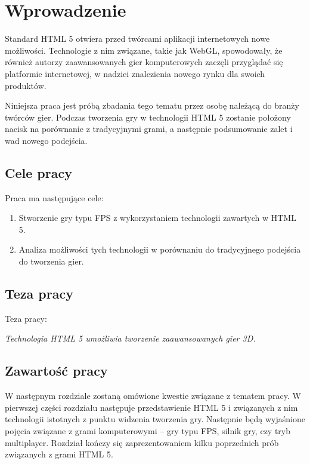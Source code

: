 \chapter{Wprowadzenie}
\label{cha:wprowadzenie}

Standard HTML 5 otwiera przed twórcami aplikacji internetowych nowe możliwości. Technologie z nim
związane, takie jak WebGL, spowodowały, że również autorzy zaawansowanych gier komputerowych
zaczęli przyglądać się platformie internetowej, w nadziei znalezienia nowego rynku dla swoich
produktów.

Niniejsza praca jest próbą zbadania tego tematu przez osobę należącą do branży twórców gier.
Podczas tworzenia gry w technologii HTML 5 zostanie położony nacisk na porównanie z tradycyjnymi
grami, a następnie podsumowanie zalet i wad nowego podejścia.


\section{Cele pracy}
\label{sec:celePracy}

Praca ma następujące cele:
\begin{enumerate}
\item Stworzenie gry typu FPS z wykorzystaniem technologii zawartych w HTML 5.
\item Analiza możliwości tych technologii w porównaniu do tradycyjnego podejścia do tworzenia gier.
\end{enumerate}


\section{Teza pracy}
\label{sec:teza}

Teza pracy:

\emph{Technologia HTML 5 umożliwia tworzenie zaawansowanych gier 3D.}

\section{Zawartość pracy}
\label{sec:zawartoscPracy}

W następnym rozdziale zostaną omówione kwestie związane z tematem pracy. W pierwszej części
rozdziału następuje przedstawienie HTML 5 i związanych z nim technologii istotnych z punktu
widzenia tworzenia gry. Następnie będą wyjaśnione pojęcia związane z grami komputerowymi --
gry typu FPS, silnik gry, czy tryb multiplayer. Rozdział kończy się zaprezentowaniem
kilku poprzednich prób związanych z grami HTML 5.

